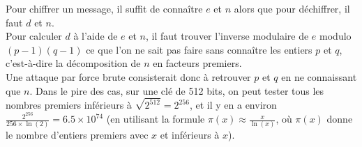 \begin{itemize}
Pour chiffrer un message, il suffit de connaître $e$ et $n$ alors que pour déchiffrer, il faut $d$ et $n$. \\
Pour calculer $d$ à l'aide de $e$ et $n$, il faut trouver l'inverse modulaire de $e$ modulo $(p - 1)(q - 1)$ ce que l'on ne sait pas faire sans connaître les entiers $p$ et $q$, c'est-à-dire la décomposition de $n$ en facteurs premiers. \\
Une attaque par force brute consisterait donc à retrouver $p$ et $q$ en ne connaissant que $n$. Dans le pire des cas, sur une clé de 512 bits, on peut tester tous les nombres premiers inférieurs à $\sqrt{2^{512}} = 2^{256}$, et il y en a environ $\frac{2^{256}}{256 \times \ln(2)} = 6.5 \times 10^{74}$ (en utilisant la formule $\pi(x) \approx \frac{x}{\ln(x)}$, où $\pi(x)$ donne le nombre d'entiers premiers avec $x$ et inférieurs à $x$).\\



\end{itemize}
